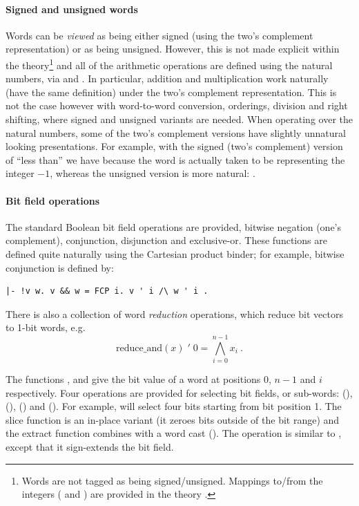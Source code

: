 {\paragraph{Signed and unsigned words}

Words can be \emph{viewed} as being either signed (using the two's
complement representation) or as being unsigned.  However, this is not
made explicit within the theory\footnote{Words are not tagged as being
  signed/unsigned.  Mappings to/from the integers ( and
  ) are provided in the theory .}
and all of the arithmetic operations are defined using the natural
numbers, \ie{} via  and .  In particular,
addition and multiplication work naturally (have the same definition)
under the two's complement representation.  This is not the case
however with word-to-word conversion, orderings, division and right
shifting, where signed and unsigned variants are needed.  When
operating over the natural numbers, some of the two's complement
versions have slightly unnatural looking presentations.  For example,
with the signed (two's complement) version of ``less than'' we have
 because the word  is actually
taken to be representing the integer $-1$, whereas the unsigned
version is more natural: .

\paragraph{Bit field operations}

The standard Boolean bit field operations are provided, \ie{} bitwise negation
(one's complement), conjunction, disjunction and exclusive-or.  These functions
are defined quite naturally using the Cartesian product binder; for example,
bitwise conjunction is defined by:
\begin{hol}
\begin{verbatim}
|- !v w. v && w = FCP i. v ' i /\ w ' i .
\end{verbatim}
\end{hol}
There is also a collection of word \emph{reduction} operations, which reduce bit vectors to 1-bit words, e.g.
\[ \mathrm{reduce\_and}(x)\;'\; 0= \bigwedge_{i = 0}^{n - 1} x_i\ .\]

The functions ,  and 
give the bit value of a word at positions $0$, $n - 1$ and $i$
respectively.  Four operations are provided for selecting bit
fields, or sub-words:  (\holtxt{--}),   (\holtxt{---}),  () and
 (\holtxt{><}).  For example,  will select four bits starting from bit position 1.  The slice function is an in-place variant (it zeroes bits outside of the bit range) and the extract function combines  with a word cast ().  The operation  is similar to , except that it sign-extends the bit field.

}
